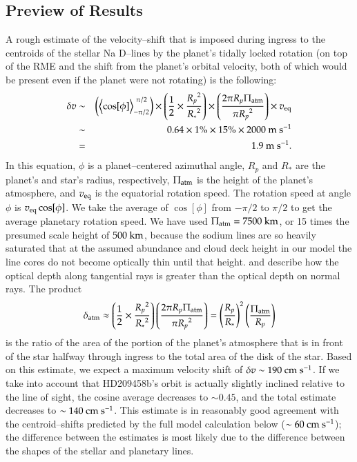 \subsection{Preview of Results}
\label{rot_ssec:preview}
A rough estimate of the velocity--shift that is imposed during ingress
to the centroids of the stellar Na D--lines by the planet's tidally
locked rotation (on top of the RME and the shift from the planet's
orbital velocity, both of which would be present even if the planet
were not rotating) is the following:
\begin{eqnarray}
\nonumber \delta v & \sim &  \left(\left< \cos[\phi] \right>_{-\pi/2}^{~\pi/2}\right) \times \left( \frac{1}{2} \times \frac{{R_p}^2}{{R_*}^2}\right) \times \left( \frac{2 \pi R_p \Pi_{\rm atm}}{\pi {R_p}^2} \right) \times v_{\rm eq} \\
\nonumber & \sim & 0.64 \times 1\% \times 15\% \times 2000 {\rm ~m~s^{-1}} \\
\label{rot_eq:Delta v estimated} & = & 1.9 {\rm ~m~s^{-1}}.
\end{eqnarray}
In this equation, $\phi$ is a planet--centered azimuthal angle, $R_p$
and $R_*$ are the planet's and star's radius, respectively, $\Pi_{\rm
atm}$ is the height of the planet's atmosphere, and $v_{\rm eq}$ is
the equatorial rotation speed.  The rotation speed at angle $\phi$ is
$v_{\rm eq} \cos[\phi]$.  We take the average of $\cos[\phi]$ from
$-\pi/2$ to $\pi/2$ to get the average planetary rotation speed.  We
have used $\Pi_{\rm atm} = 7500 {\rm ~km}$, or 15 times the presumed
scale height of $500 {\rm ~km}$, because the sodium lines are so
heavily saturated that at the assumed abundance and cloud deck height
in our model the line cores do not become optically thin until that
height.  \citet{burrows_et_al2004} and \citet{fortney2005} describe
how the optical depth along tangential rays is greater than the
optical depth on normal rays. The product
\[
\delta_{\rm atm} \approx \left( \frac{1}{2} \times \frac{{R_p}^2}{{R_*}^2}\right) \left( \frac{2 \pi R_p \Pi_{\rm atm}}{\pi {R_p}^2} \right) = \left(\frac{R_p}{R_*}\right)^2 \left( \frac{\Pi_{\rm atm}}{R_p} \right)
\]
is the ratio of the area of the portion of the planet's atmosphere
that is in front of the star halfway through ingress to the total area
of the disk of the star.  Based on this estimate, we expect a maximum
velocity shift of $\delta v \sim 190 {\rm ~cm~s^{-1}}$.  If we take
into account that HD209458b's orbit is actually slightly inclined
relative to the line of sight, the cosine average decreases to $\sim
0.45$, and the total estimate decreases to $\sim 140 {\rm~cm~s^{-1}}$.
This estimate is in reasonably good agreement with the
centroid--shifts predicted by the full model calculation below ($\sim
60 {\rm ~cm~s^{-1}}$); the difference between the estimates is most
likely due to the difference between the shapes of the stellar and
planetary lines.

